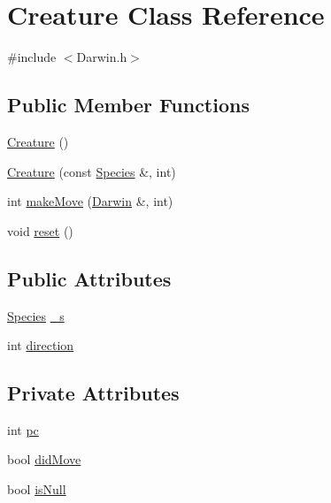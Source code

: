 \hypertarget{classCreature}{\section{Creature Class Reference}
\label{classCreature}
}


{\ttfamily \#include $<$Darwin.\-h$>$}

\subsection*{Public Member Functions}
\begin{DoxyCompactItemize}
\item 
\hyperlink{classCreature_a597cc3b08ee17de46c3e7ec3cf0d9b58}{Creature} ()
\item 
\hyperlink{classCreature_afa04513ddf113f072453cd8baabbd0c3}{Creature} (const \hyperlink{classSpecies}{Species} \&, int)
\item 
int \hyperlink{classCreature_a754b6c4436a889809be4a78e8b72399a}{make\-Move} (\hyperlink{classDarwin}{Darwin} \&, int)
\item 
void \hyperlink{classCreature_a2d8f0e96ad41fd5d962c4fdbbed9a32b}{reset} ()
\end{DoxyCompactItemize}
\subsection*{Public Attributes}
\begin{DoxyCompactItemize}
\item 
\hyperlink{classSpecies}{Species} \hyperlink{classCreature_a1fb20eb7477dd7a763ff3d5845beae54}{\-\_\-s}
\item 
int \hyperlink{classCreature_a6b3f59d2ca15b6781d81c3c141509976}{direction}
\end{DoxyCompactItemize}
\subsection*{Private Attributes}
\begin{DoxyCompactItemize}
\item 
int \hyperlink{classCreature_a81b808ceee6ddc5c0a97e0b97b19a707}{pc}
\item 
bool \hyperlink{classCreature_ade9322f97d63a42aeb133a3c43c416ae}{did\-Move}
\item 
bool \hyperlink{classCreature_a38637bca6404ecf82079d00603b23f1d}{is\-Null}
\end{DoxyCompactItemize}



